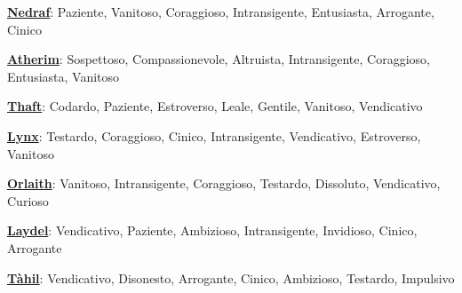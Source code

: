 \begin{multicols}{2}
{\smallskip

\textbf{\hyperlink{nedraf}{Nedraf}}: Paziente, Vanitoso, Coraggioso, Intransigente, Entusiasta, Arrogante, Cinico

\smallskip

\textbf{\hyperlink{atherim}{Atherim}}: Sospettoso, Compassionevole, Altruista, Intransigente, Coraggioso, Entusiasta, Vanitoso\

\smallskip

\textbf{\hyperlink{thaft}{Thaft}}: Codardo, Paziente, Estroverso, Leale, Gentile, Vanitoso, Vendicativo

\smallskip

\textbf{\hyperlink{lynx}{Lynx}}: Testardo, Coraggioso, Cinico, Intransigente, Vendicativo, Estroverso, Vanitoso

\smallskip

\textbf{\hyperlink{orlaith}{Orlaith}}: Vanitoso, Intransigente, Coraggioso, Testardo, Dissoluto, Vendicativo, Curioso

\smallskip

\textbf{\hyperlink{laydel}{Laydel}}: Vendicativo, Paziente, Ambizioso, Intransigente, Invidioso, Cinico, Arrogante

\smallskip

\textbf{\hyperlink{tahil}{Tàhil}}: Vendicativo, Disonesto, Arrogante, Cinico, Ambizioso, Testardo, Impulsivo

}

\end{multicols}




\pagebreak

